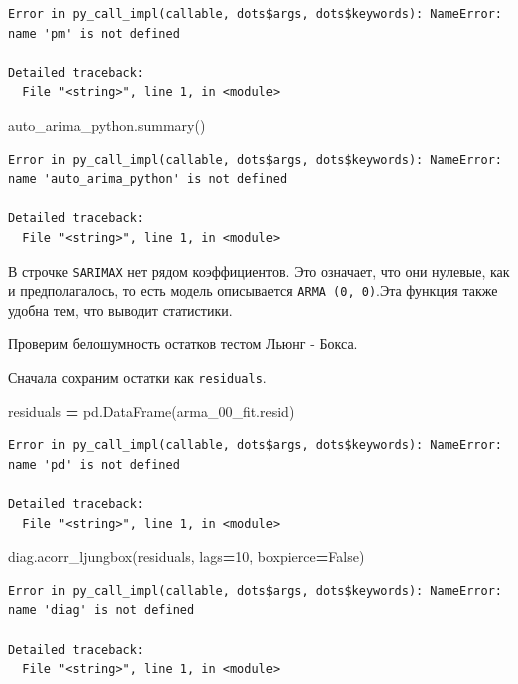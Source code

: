 \documentclass[]{book}
\newenvironment{Shaded}{\begin{snugshade}}{\end{snugshade}}
\newcommand{\DecValTok}[1]{\textcolor[rgb]{0.00,0.00,0.81}{#1}}
\newcommand{\NormalTok}[1]{#1}
\newcommand{\OperatorTok}[1]{\textcolor[rgb]{0.81,0.36,0.00}{\textbf{#1}}}
\newcommand{\VariableTok}[1]{\textcolor[rgb]{0.00,0.00,0.00}{#1}}
\begin{document}
\begin{verbatim}
Error in py_call_impl(callable, dots$args, dots$keywords): NameError: name 'pm' is not defined

Detailed traceback: 
  File "<string>", line 1, in <module>
\end{verbatim}

\begin{Shaded}
\begin{Highlighting}[]
\NormalTok{auto_arima_python.summary()}
\end{Highlighting}
\end{Shaded}

\begin{verbatim}
Error in py_call_impl(callable, dots$args, dots$keywords): NameError: name 'auto_arima_python' is not defined

Detailed traceback: 
  File "<string>", line 1, in <module>
\end{verbatim}

В строчке \texttt{SARIMAX} нет рядом коэффициентов. Это означает, что они нулевые, как и предполагалось, то есть модель описывается \texttt{ARMA\ (0,\ 0)}.Эта функция также удобна тем, что выводит статистики.

Проверим белошумность остатков тестом Льюнг - Бокса.

Сначала сохраним остатки как \texttt{residuals}.

\begin{Shaded}
\begin{Highlighting}[]
\NormalTok{residuals }\OperatorTok{=}\NormalTok{ pd.DataFrame(arma_00_fit.resid)}
\end{Highlighting}
\end{Shaded}

\begin{verbatim}
Error in py_call_impl(callable, dots$args, dots$keywords): NameError: name 'pd' is not defined

Detailed traceback: 
  File "<string>", line 1, in <module>
\end{verbatim}

\begin{Shaded}
\begin{Highlighting}[]
\NormalTok{diag.acorr_ljungbox(residuals, lags}\OperatorTok{=}\DecValTok{10}\NormalTok{, boxpierce}\OperatorTok{=}\VariableTok{False}\NormalTok{)}
\end{Highlighting}
\end{Shaded}

\begin{verbatim}
Error in py_call_impl(callable, dots$args, dots$keywords): NameError: name 'diag' is not defined

Detailed traceback: 
  File "<string>", line 1, in <module>
\end{verbatim}
\end{document}
